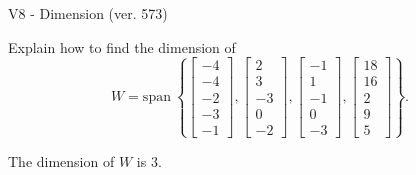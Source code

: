\begin{exercise}
  \begin{exerciseTitle}V8 - Dimension (ver. 573)\end{exerciseTitle}
  \begin{exerciseStatement}
    Explain how to find the dimension of 
\[W=\mathrm{span}\ \left\{\left[\begin{array}{r}
-4 \\
-4 \\
-2 \\
-3 \\
-1
\end{array}\right] , \left[\begin{array}{r}
2 \\
3 \\
-3 \\
0 \\
-2
\end{array}\right] , \left[\begin{array}{r}
-1 \\
1 \\
-1 \\
0 \\
-3
\end{array}\right] , \left[\begin{array}{r}
18 \\
16 \\
2 \\
9 \\
5
\end{array}\right]\right\}.\]



  \end{exerciseStatement}
  \begin{exerciseAnswer}
   The dimension of \(W\) is  \(3\).
  


  \end{exerciseAnswer}
\end{exercise}